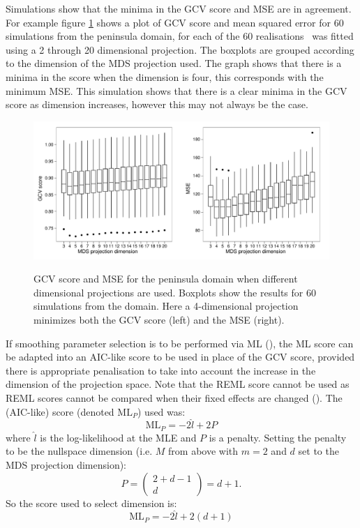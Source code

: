 Simulations show that the minima in the GCV score and MSE are in agreement. For example figure \ref{wt2-gcv-projdim-boxplot} shows a plot of GCV score and mean squared error for 60 simulations from the peninsula domain, for each of the 60 realisations \mdsds\ was fitted using a 2 through 20 dimensional projection. The boxplots are grouped according to the dimension of the MDS projection used. The graph shows that there is a minima in the score when the dimension is four, this corresponds with the minimum MSE. This simulation shows that there is a clear minima in the GCV score as dimension increases, however this may not always be the case.

\begin{figure}
\centering
\includegraphics[width=6in]{mds/figs/wt2-gcv-projdim-boxplot.pdf} \\
\caption{GCV score and MSE for the peninsula domain when different dimensional projections are used. Boxplots show the results for 60 simulations from the domain. Here a 4-dimensional projection minimizes both the GCV score (left) and the MSE (right).}
\label{wt2-gcv-projdim-boxplot}
\end{figure}

If smoothing parameter selection is to be performed via ML (), the ML score can be adapted into an AIC-like score to be used in place of the GCV score, provided there is appropriate penalisation to take into account the increase in the dimension of the projection space. Note that the REML score cannot be used as REML scores cannot be compared when their fixed effects are changed (\cite{remlpaper}). The (AIC-like) score (denoted $\text{ML}_P$) used was:
\begin{equation*}
\text{ML}_P = -2 \hat{l} + 2P
\end{equation*}
where $\hat{l}$ is the log-likelihood at the MLE and $P$ is a penalty. Setting the penalty to be the nullspace dimension (i.e. $M$ from above with $m=2$ and $d$ set to the MDS projection dimension):
\begin{equation*}
P = \begin{pmatrix} 2+d-1 \\ d  \end{pmatrix} = d+1.
\end{equation*}
So the score used to select dimension is:
\begin{equation*}
\text{ML}_P = -2 \hat{l} + 2(d+1)
\end{equation*}

